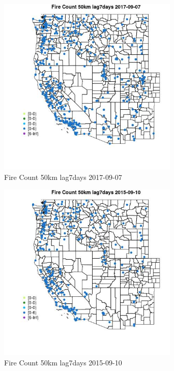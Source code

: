 \begin{figure} 
\centering  
\includegraphics[width=0.77\textwidth]{Code_Outputs/Report_ML_input_PM25_Step4_part_e_de_duplicated_aves_compiled_2019-05-21wNAs_MapObsFire_Count_50km_lag7days2017-09-07.jpg} 
\caption{\label{fig:Report_ML_input_PM25_Step4_part_e_de_duplicated_aves_compiled_2019-05-21wNAsMapObsFire_Count_50km_lag7days2017-09-07}Fire Count 50km lag7days 2017-09-07} 
\end{figure} 
 

\begin{figure} 
\centering  
\includegraphics[width=0.77\textwidth]{Code_Outputs/Report_ML_input_PM25_Step4_part_e_de_duplicated_aves_compiled_2019-05-21wNAs_MapObsFire_Count_50km_lag7days2015-09-10.jpg} 
\caption{\label{fig:Report_ML_input_PM25_Step4_part_e_de_duplicated_aves_compiled_2019-05-21wNAsMapObsFire_Count_50km_lag7days2015-09-10}Fire Count 50km lag7days 2015-09-10} 
\end{figure} 
 

